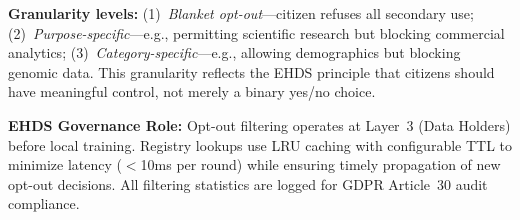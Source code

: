 \documentclass[conference]{IEEEtran}
\begin{document}
\textbf{Granularity levels:} (1)~\textit{Blanket opt-out}---citizen refuses all secondary use; (2)~\textit{Purpose-specific}---e.g., permitting scientific research but blocking commercial analytics; (3)~\textit{Category-specific}---e.g., allowing demographics but blocking genomic data. This granularity reflects the EHDS principle that citizens should have meaningful control, not merely a binary yes/no choice.

\textbf{EHDS Governance Role:} Opt-out filtering operates at Layer~3 (Data Holders) before local training. Registry lookups use LRU caching with configurable TTL to minimize latency ($<$10ms per round) while ensuring timely propagation of new opt-out decisions. All filtering statistics are logged for GDPR Article~30 audit compliance.

\begin{figure}[htbp]
\centering
{}
\end{figure}
\end{document}
